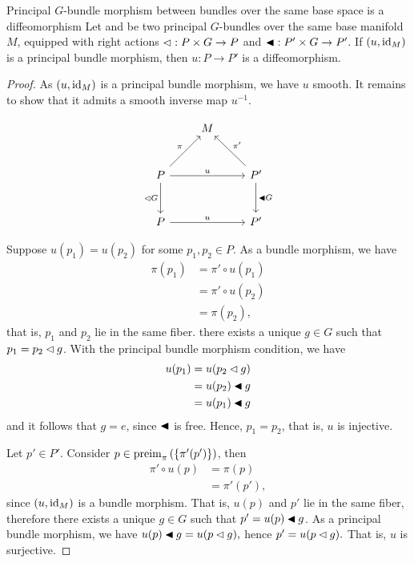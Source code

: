 \begin{lemma}{Principal \(G\)-bundle morphism between bundles over the same base space is a diffeomorphism}{}
    Let  and  be two principal \(G\)-bundles over the same base manifold \(M\), equipped with right actions \(\mathbin{\vartriangleleft} : P \times G \to P\) and \(\mathbin{\blacktriangleleft} : P' \times G \to P'\). If \((u, \operatorname{id}_{M})\) is a principal bundle morphism, then \(u : P \to P'\) is a diffeomorphism.
\end{lemma}
\begin{proof}
    As \((u, \operatorname{id}_{M})\) is a principal bundle morphism, we have \(u\) smooth. It remains to show that it admits a smooth inverse map \(u^{-1}\).

    \begin{equation*}
        \begin{tikzcd}[column sep = normal, row sep = large]
            & M &\\
            P \arrow{ru}{\pi} \arrow[swap]{d}{\ract G} \arrow{rr}{u} && P' \arrow{d}{\ractalt G} \arrow[swap]{lu}{\pi'}\\
            P \arrow{rr}{u} && P'
        \end{tikzcd}
    \end{equation*}

    Suppose \(u(p_1) = u(p_2)\) for some \(p_1, p_2 \in P\). As a bundle morphism, we have
    \begin{align*}
        \pi(p_1) &= \pi' \circ u(p_1)\\
                 &= \pi' \circ u(p_2)\\
                 &= \pi(p_2),
    \end{align*}
    that is, \(p_1\) and \(p_2\) lie in the same fiber. %
     there exists a unique \(g \in G\) such that \(p_1 = p_2 \mathbin{\vartriangleleft} g\). With the principal bundle morphism condition, we have
    \begin{align*}
        u(p_1) &= u(p_2 \mathbin{\vartriangleleft} g)\\
               &= u(p_2) \mathbin{\blacktriangleleft} g\\
               &= u(p_1) \mathbin{\blacktriangleleft} g
    \end{align*}
    and it follows that \(g = e\), since \(\mathbin{\blacktriangleleft}\) is free. Hence, \(p_1 = p_2\), that is, \(u\) is injective.

    Let \(p' \in P'\). Consider \(p \in \operatorname{preim}_{\pi}{\left(\{\pi'(p')\}\right)}\), then
    \begin{align*}
        \pi'\circ u (p) &= \pi(p)\\
                        &= \pi'(p'),
    \end{align*}
    since \((u, \operatorname{id}_{M})\) is a bundle morphism. That is, \(u(p)\) and \(p'\) lie in the same fiber, therefore there exists a unique \(g \in G\) such that \(p' = u(p) \mathbin{\blacktriangleleft} g\). As a principal bundle morphism, we have \(u(p) \mathbin{\blacktriangleleft} g = u(p \mathbin{\vartriangleleft} g),\) hence \(p' = u(p \mathbin{\vartriangleleft} g).\) That is, \(u\) is surjective.


\end{proof}
